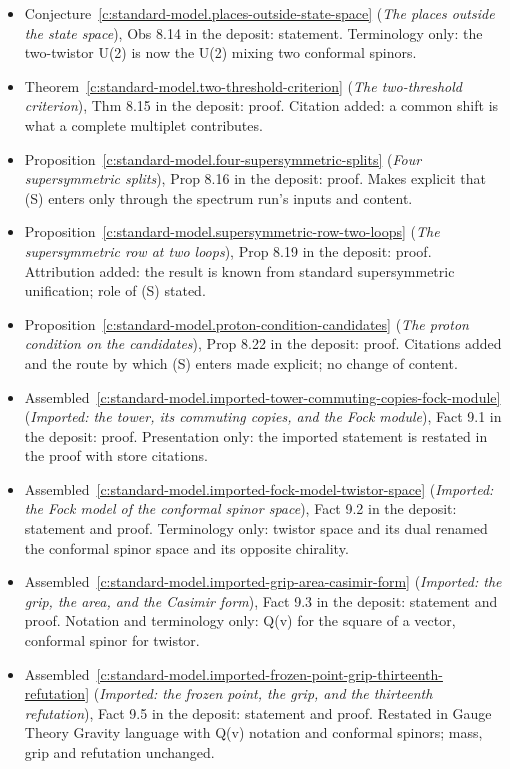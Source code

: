 \documentclass[11pt]{article}
\theoremstyle{definition}
\theoremstyle{plain}
\begin{document}
\begin{itemize}
\item Conjecture~\ref{c:standard-model.places-outside-state-space} (\emph{The places outside the state space}), Obs 8.14 in the deposit: statement. Terminology only: the two-twistor U(2) is now the U(2) mixing two conformal spinors.
\item Theorem~\ref{c:standard-model.two-threshold-criterion} (\emph{The two-threshold criterion}), Thm 8.15 in the deposit: proof. Citation added: a common shift is what a complete multiplet contributes.
\item Proposition~\ref{c:standard-model.four-supersymmetric-splits} (\emph{Four supersymmetric splits}), Prop 8.16 in the deposit: proof. Makes explicit that (S) enters only through the spectrum run's inputs and content.
\item Proposition~\ref{c:standard-model.supersymmetric-row-two-loops} (\emph{The supersymmetric row at two loops}), Prop 8.19 in the deposit: proof. Attribution added: the result is known from standard supersymmetric unification; role of (S) stated.
\item Proposition~\ref{c:standard-model.proton-condition-candidates} (\emph{The proton condition on the candidates}), Prop 8.22 in the deposit: proof. Citations added and the route by which (S) enters made explicit; no change of content.
\item Assembled~\ref{c:standard-model.imported-tower-commuting-copies-fock-module} (\emph{Imported: the tower, its commuting copies, and the Fock module}), Fact 9.1 in the deposit: proof. Presentation only: the imported statement is restated in the proof with store citations.
\item Assembled~\ref{c:standard-model.imported-fock-model-twistor-space} (\emph{Imported: the Fock model of the conformal spinor space}), Fact 9.2 in the deposit: statement and proof. Terminology only: twistor space and its dual renamed the conformal spinor space and its opposite chirality.
\item Assembled~\ref{c:standard-model.imported-grip-area-casimir-form} (\emph{Imported: the grip, the area, and the Casimir form}), Fact 9.3 in the deposit: statement and proof. Notation and terminology only: Q(v) for the square of a vector, conformal spinor for twistor.
\item Assembled~\ref{c:standard-model.imported-frozen-point-grip-thirteenth-refutation} (\emph{Imported: the frozen point, the grip, and the thirteenth refutation}), Fact 9.5 in the deposit: statement and proof. Restated in Gauge Theory Gravity language with Q(v) notation and conformal spinors; mass, grip and refutation unchanged.

\end{itemize}
\end{document}
